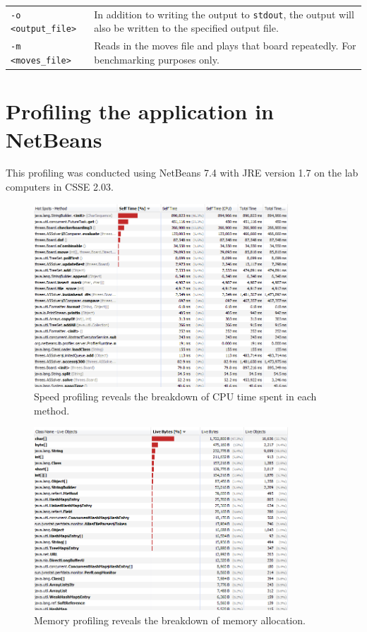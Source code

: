 \documentclass[a4paper, 11pt, titlepage]{report}
\begin{document}
\begin{appendices}
\begin{table}[H]
\begin{tabularx}{\textwidth}{lX}
    \texttt{-o <output\_file>} & In addition to writing the output to \texttt{stdout}, the output will also be written to the specified output file. \\
    \texttt{-m <moves\_file>} & Reads in the moves file and plays that board repeatedly. For benchmarking purposes only. \\
    \hline
    \end{tabularx}%
  \label{tab:method2-parameters}%
\end{table}%

\chapter{Profiling the application in NetBeans}\label{appendix-profiling}
This profiling was conducted using NetBeans 7.4 with JRE version 1.7 on the lab computers in CSSE 2.03.

\begin{figure}[H]
	\centering
	\includegraphics[width=0.85\textwidth]{figures/Speed-profiling.png}
	\caption{Speed profiling reveals the breakdown of CPU time spent in each method.}
	\label{fig:speed-profiling}
\end{figure}

\begin{figure}[H]
	\centering
	\includegraphics[width=0.85\textwidth]{figures/Memory-profiling.png}
	\caption{Memory profiling reveals the breakdown of memory allocation.}
	\label{fig:speed-profiling}
\end{figure}

\end{appendices}
\end{document}
